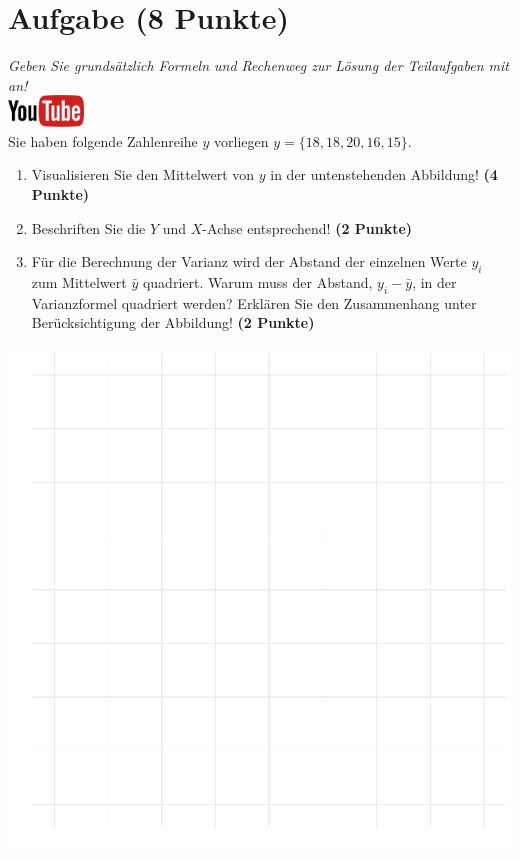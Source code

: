 \documentclass[a4paper, 9pt]{scrartcl}\usepackage[]{graphicx}\usepackage[]{xcolor}
\makeatletter
\def\maxwidth{ %
  \ifdim\Gin@nat@width>\linewidth
    \linewidth
  \else
    \Gin@nat@width
  \fi
}
\makeatother
\begin{document}
\section{Aufgabe \hfill (8 Punkte)}

\textit{Geben Sie grunds{\"a}tzlich Formeln und Rechenweg zur L{\"o}sung der
  Teilaufgaben mit an!} \\[1Ex]

\hfill\href{https://youtu.be/oMdtYbDInYE}{\includegraphics[width =
  2cm]{img/youtube}}\\[1Ex]

Sie haben folgende Zahlenreihe $y$ vorliegen
$y = \{18, 18, 20, 16, 15\}$.

\begin{enumerate}
\item Visualisieren Sie den Mittelwert von $y$ in der untenstehenden
  Abbildung! \textbf{(4 Punkte)}
\item Beschriften Sie die $Y$ und $X$-Achse entsprechend! \textbf{(2 Punkte)}
\item F{\"u}r die Berechnung der Varianz wird der Abstand der einzelnen Werte $y_i$
  zum Mittelwert $\bar{y}$ quadriert. Warum muss der Abstand, $y_i -
  \bar{y}$, in der Varianzformel quadriert werden?
  Erkl{\"a}ren Sie den Zusammenhang unter Ber{\"u}cksichtigung der Abbildung!
  \textbf{(2 Punkte)}  
\end{enumerate}



{\centering \includegraphics[width=\maxwidth]{img/desc-01-1} 

}
\end{document}
